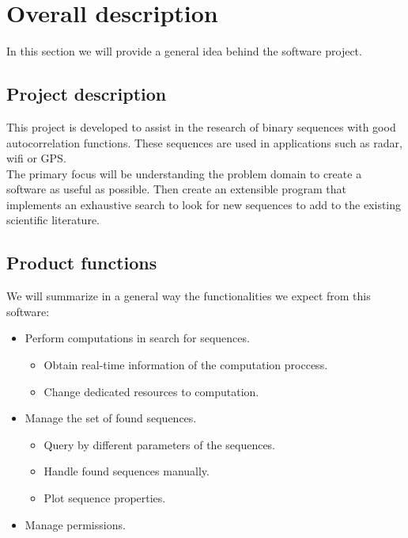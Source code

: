 \section{Overall description}

  In this section we will provide a general idea behind the software project.
  \subsection{Project description}

  This project is developed to assist in the research of binary sequences with
  good autocorrelation functions. These sequences are used in applications such
  as radar, wifi or GPS.\\

  The primary focus will be understanding the problem domain to create a
  software as useful as possible. Then create an extensible program that
  implements an exhaustive search to look for new sequences to add to the
  existing scientific literature.\\

  \subsection{Product functions}

  We will summarize in a general way the functionalities we expect from
  this software:

  \begin{itemize}
    \item Perform computations in search for sequences.\\
            \begin{itemize}
              \item Obtain real-time information of the computation proccess.
              \item Change dedicated resources to computation.
            \end{itemize}
    \item Manage the set of found sequences.
            \begin{itemize}
              \item Query by different parameters of the sequences.
              \item Handle found sequences manually.
              \item Plot sequence properties.
            \end{itemize}
    \item Manage permissions.
  \end{itemize}

